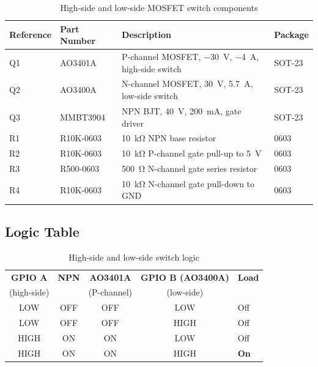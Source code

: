 \documentclass[12pt,letterpaper]{article}
\begin{document}
	\begin{table}[h]
		\centering
		\begin{tabular}{llll}
			\hline
			\textbf{Reference} & \textbf{Part Number} & \textbf{Description} & \textbf{Package} \\
			\hline
			Q1 & AO3401A   & P-channel MOSFET, \SI{-30}{\volt}, \SI{-4}{\ampere}, high-side switch & SOT-23 \\
			Q2 & AO3400A   & N-channel MOSFET, \SI{30}{\volt}, \SI{5.7}{\ampere}, low-side switch  & SOT-23 \\
			Q3 & MMBT3904  & NPN BJT, \SI{40}{\volt}, \SI{200}{\milli\ampere}, gate driver         & SOT-23 \\
			R1 & R10K-0603 & \SI{10}{\kilo\ohm} NPN base resistor                                  & 0603   \\
			R2 & R10K-0603 & \SI{10}{\kilo\ohm} P-channel gate pull-up to \SI{5}{\volt}            & 0603   \\
			R3 & R500-0603 & \SI{500}{\ohm} N-channel gate series resistor                         & 0603   \\
			R4 & R10K-0603 & \SI{10}{\kilo\ohm} N-channel gate pull-down to GND                   & 0603   \\
			\hline
		\end{tabular}
		\caption{High-side and low-side MOSFET switch components}
		\label{tab:highside_parts}
	\end{table}
	
	\subsection{Logic Table}
	
	\begin{table}[h]
		\centering
		\begin{tabular}{ccccl}
			\hline
			\textbf{GPIO A} & \textbf{NPN} & \textbf{AO3401A} & \textbf{GPIO B (AO3400A)} & \textbf{Load} \\
			(high-side)     &              & (P-channel)      & (low-side)                &               \\
			\hline
			LOW  & OFF & OFF & LOW  & Off \\
			LOW  & OFF & OFF & HIGH & Off \\
			HIGH & ON  & ON  & LOW  & Off \\
			HIGH & ON  & ON  & HIGH & \textbf{On} \\
			\hline
		\end{tabular}
		\caption{High-side and low-side switch logic}
		\label{tab:highside_logic}
	\end{table}
	
\end{document}
